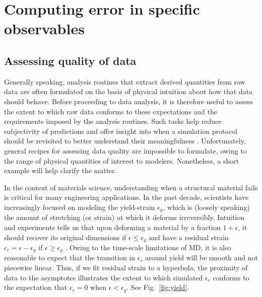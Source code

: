 \section{Computing error in specific observables}




\subsection{Assessing quality of data}
Generally speaking, analysis routines that extract derived quantities from raw data are often formulated on the basis of physical intuition about how that data should behave.  Before proceeding to data analysis, it is therefore useful to assess the extent to which raw data conforms to these expectations and the requirements imposed by the analysis routines.  Such tasks help reduce subjectivity of predictions and offer insight into when a simulation protocol should be revisited to better understand their meaningfulness \cite{patrone1}.  Unfortunately, general recipes for assessing data quality are impossible to formulate, owing to the range of physical quantities of interest to modelers.  Nonetheless, a short example will help clarify the matter.

In the context of materials science, understanding when a structural material fails is critical for many engineering applications.  In the past decade, scientists have increasingly focused on modeling the yield-strain $\epsilon_y$, which is (loosely speaking) the amount of stretching (or strain) at which it deforms irreversibly.  Intuition and experiments tells us that upon deforming a material by a fraction $1+\epsilon$, it should recover its original dimensions if $\epsilon \le \epsilon_y$ and have a residual strain $\epsilon_r = \epsilon - \epsilon_y$ if $\epsilon \ge \epsilon_y$ \cite{patrone2}.  Owing to the time-scale limitations of MD, it is also reasonable to expect that the transition in $\epsilon_r$ around yield will be smooth and not piecewise linear.  Thus, if we fit residual strain to a hyperbola, the proximity of data to the asymptotes illustrates the extent to which simulated $\epsilon_r$ conforms to the expectation that $\epsilon_r=0$ when $\epsilon < \epsilon_y$.  See Fig.~\ref{fig:yield}.

